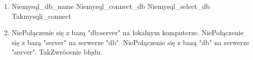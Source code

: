 \begin{enumerate}
		\newpage
		\item {}%
			{Nie}{mysql\_db\_name}%
			{Nie}{mysql\_connect\_db}%
			{Nie}{mysql\_select\_db}%
			{Tak}{mysqli\_connect}
		
		\item {}%
			{Nie}{Połączenie się z bazą "db:server" na lokalnym komputerze.}%
			{Nie}{Połączenie się z bazą "server" na serwerze "db".}%
			{Nie}{Połączenie się z bazą "db" na serwerze "server".}%
			{Tak}{Zwrócenie błędu.}
		
	\end{enumerate}





